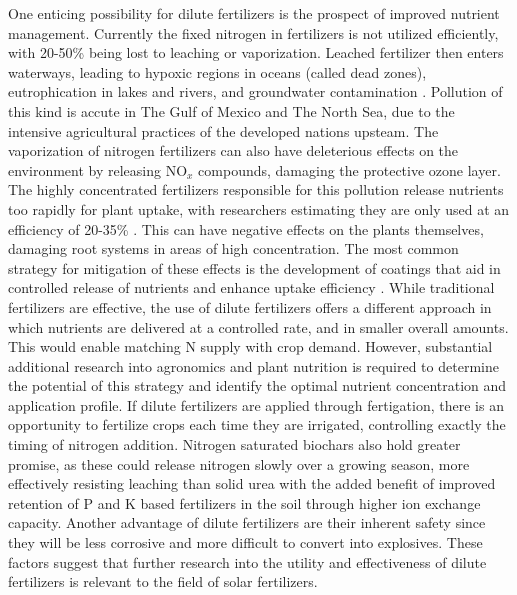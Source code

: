 One enticing possibility for dilute fertilizers is the prospect of improved nutrient management. Currently the fixed nitrogen in fertilizers is not utilized efficiently, with 20-50\% being lost to leaching or vaporization.\cite{Smil_1999_2} \needcite Leached fertilizer then enters waterways, leading to hypoxic regions in oceans (called dead zones), eutrophication in lakes and rivers, and groundwater contamination \cite{Diaz2008,Conley_2009,Shindo_2006}.  Pollution of this kind is accute in The Gulf of Mexico and The North Sea, due to the intensive agricultural practices of the developed nations upsteam\cite{Diaz2008,Conley_2009}. The vaporization of nitrogen fertilizers can also have deleterious effects on the environment by releasing NO$_x$ compounds, damaging the protective ozone layer\cite{Ravishankara_2009}. The highly concentrated fertilizers responsible for this pollution release nutrients too rapidly for plant uptake, with researchers estimating they are only used at an efficiency of 20-35\% \cite{Naz_2016}. This can have negative effects on the plants themselves, damaging root systems in areas of high concentration.\cite{Morgan2009} The most common strategy for mitigation of these effects is the development of coatings that aid in controlled release of nutrients and enhance uptake efficiency \cite{Naz_2016}. While traditional fertilizers are effective, the use of dilute fertilizers offers a different approach in which nutrients are delivered at a controlled rate, and in smaller overall amounts.\cite{kadyampakeni_2015} This would enable matching N supply with crop demand. However, substantial additional research into agronomics and plant nutrition is required to determine the potential of this strategy and identify the optimal nutrient concentration and application profile. If dilute fertilizers are applied through fertigation, there is an opportunity to fertilize crops each time they are irrigated, controlling exactly the timing of nitrogen addition. Nitrogen saturated biochars also hold greater promise, as these could release nitrogen slowly over a growing season, more effectively resisting leaching than solid urea with the added benefit of improved retention of P and K based fertilizers in the soil through higher ion exchange capacity.\cite{Glaser2002} Another advantage of dilute fertilizers are their inherent safety since they will be less corrosive and more difficult to convert into explosives. These factors suggest that further research into the utility and effectiveness of dilute fertilizers is relevant to the field of solar fertilizers.

